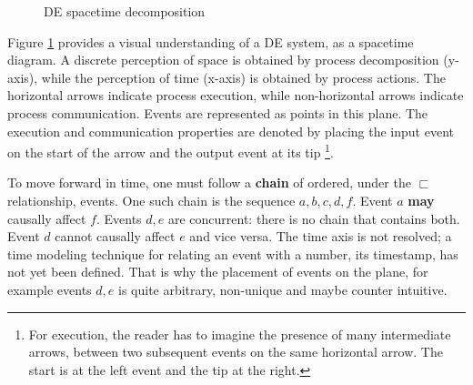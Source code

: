 \documentclass[11pt]{article}
\begin{document}
\begin{figure}[htpb]
\centering
{}
\caption{DE spacetime decomposition} 
\label{fig:DE}
\end{figure}

Figure \ref{fig:DE} provides a visual understanding of a DE system, as a spacetime diagram.
A discrete perception of space is obtained by process decomposition (y-axis), while the perception of time (x-axis) is obtained by process actions.
The horizontal arrows indicate process execution, while non-horizontal arrows indicate process communication.
Events are represented as points in this plane.
The execution and communication properties are denoted by placing the input event on the start of the arrow and the output event at its tip \footnote{For execution, the reader has to imagine the presence of many intermediate arrows, between two subsequent events on the same horizontal arrow. The start is at the left event and the tip at the right.}.

To move forward in time, one must follow a \textbf{chain} of ordered, under the \(\sqsubset\) relationship, events.
One such chain is the sequence \(a,b,c,d,f\).
Event \(a\) \textbf{may} causally affect \(f\).
Events \(d,e\) are concurrent: there is no chain that contains both.
Event \(d\) cannot causally affect \(e\) and vice versa.
The time axis is not resolved; a time modeling technique for relating an event with a number, its timestamp, has not yet been defined. 
That is why the placement of events on the plane, for example events \(d,e\) is quite arbitrary, non-unique and maybe counter intuitive.
\end{document}
